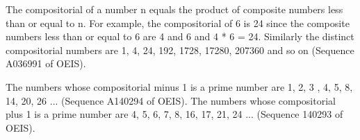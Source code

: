 \documentclass[12pt]{article}
\begin{document}
The compositorial of a number n equals the product of composite numbers less than or equal to n. For example, the compositorial of 6 is 24 since the composite numbers less than or equal to 6 are 4 and 6 and 4 * 6 = 24. Similarly the distinct compositorial numbers are 1, 4, 24, 192, 1728, 17280, 207360 and so on (Sequence A036991 of OEIS).

The numbers whose compositorial minus 1 is a prime number are 1, 2, 3 , 4, 5, 8, 14, 20, 26 ... (Sequence A140294 of OEIS). The numbers whose compositorial plus 1 is a prime number are 4, 5, 6, 7, 8, 16, 17, 21, 24 ... (Sequence 140293 of OEIS).
\end{document}
